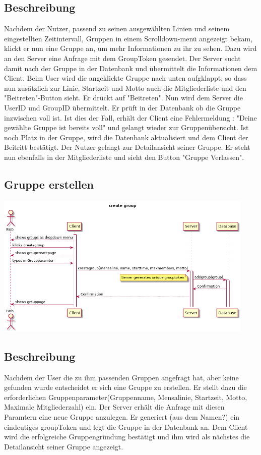 \documentclass[a4paper]{scrreprt}
\begin{document}
\subsection*{Beschreibung}
Nachdem der Nutzer, passend zu seinen ausgewählten Linien und seinem eingestellten Zeitintervall, Gruppen in einem Scrolldown-menü angezeigt bekam, klickt er nun eine Gruppe an, um mehr Informationen zu ihr zu sehen. Dazu wird an den Server eine Anfrage mit dem GroupToken gesendet. Der Server sucht damit nach der Gruppe in der Datenbank und übermittelt die Informationen dem Client. Beim User wird die angeklickte Gruppe nach unten aufgklappt, so dass nun zusätzlich zur Linie, Startzeit und Motto auch die Mitgliederliste und den "Beitreten"-Button sieht. Er drückt auf "Beitreten". Nun wird dem Server die UserID und GroupID übermittelt. Er prüft in der Datenbank ob die Gruppe inzwischen voll ist. Ist dies der Fall, erhält der Client eine Fehlermeldung : "Deine gewählte Gruppe ist bereits voll" und gelangt wieder zur Gruppenübersicht. Ist noch Platz in der Gruppe, wird die Datenbank aktualisiert und dem Client der Beitritt bestätigt. Der Nutzer gelangt zur Detailansicht seiner Gruppe. Er steht nun ebenfalls in der Mitgliederliste und sieht den Button "Gruppe Verlassen".

\newpage
\subsection{Gruppe erstellen}
\begin{center}
\includegraphics[width=0.93\textwidth]{Sequenzdiagramme/CreateGroup.png}

\end{center}
\subsection*{Beschreibung}
Nachdem der User die zu ihm passenden Gruppen angefragt hat, aber keine gefunden wurde entscheidet er sich eine Gruppe zu erstellen. Er stellt dazu die erforderlichen Gruppenparameter(Gruppenname, Mensalinie, Startzeit, Motto, Maximale Mitgliederzahl) ein. Der Server erhält die Anfrage mit diesen Paramtern eine neue Gruppe anzulegen. Er generiert (aus dem Namen?) ein eindeutiges groupToken und legt die Gruppe in der Datenbank an. Dem Client wird die erfolgreiche Gruppengründung bestätigt und ihm wird als nächstes die Detailansicht seiner Gruppe angezeigt.
\end{document}
